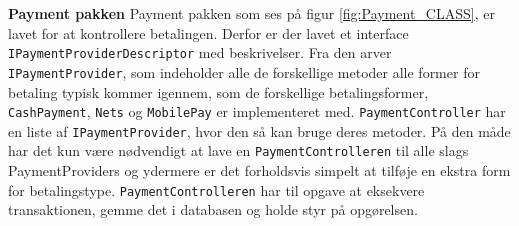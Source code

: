 \textbf{Payment pakken}
\newline
Payment pakken som ses på figur \ref{fig:Payment_CLASS}, er lavet for at kontrollere betalingen. Derfor er der lavet et interface \texttt{IPaymentProviderDescriptor} med beskrivelser. Fra den arver \texttt{IPaymentProvider}, som indeholder alle de forskellige metoder alle former for betaling typisk kommer igennem, som de forskellige betalingsformer, \texttt{CashPayment}, \texttt{Nets} og \texttt{MobilePay} er implementeret med. 
\newline
\newline
\texttt{PaymentController} har en liste af \texttt{IPaymentProvider}, hvor den så kan bruge deres metoder. På den måde har det kun være nødvendigt at lave en \texttt{PaymentControlleren} til alle slags PaymentProviders og ydermere er det forholdsvis simpelt at tilføje en ekstra form for betalingstype.
\newline
\newline
\texttt{PaymentControlleren} har til opgave at eksekvere transaktionen, gemme det i databasen og holde styr på opgørelsen. 